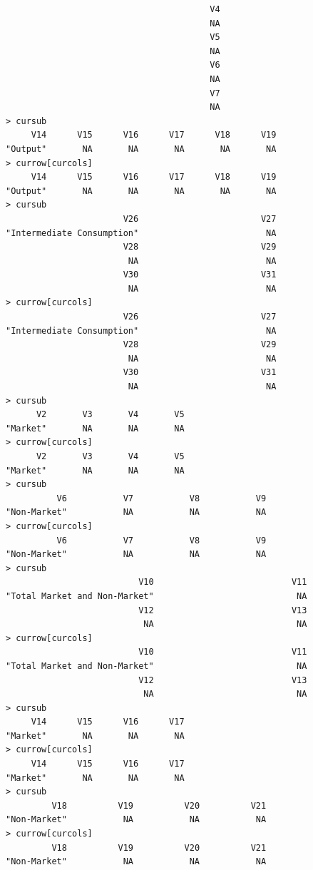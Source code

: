 \documentclass[a4paper]{article}
\begin{document}
\begin{verbatim}
                                        V4 
                                        NA 
                                        V5 
                                        NA 
                                        V6 
                                        NA 
                                        V7 
                                        NA 
> cursub 
     V14      V15      V16      V17      V18      V19 
"Output"       NA       NA       NA       NA       NA 
> currow[curcols] 
     V14      V15      V16      V17      V18      V19 
"Output"       NA       NA       NA       NA       NA 
> cursub 
                       V26                        V27 
"Intermediate Consumption"                         NA 
                       V28                        V29 
                        NA                         NA 
                       V30                        V31 
                        NA                         NA 
> currow[curcols] 
                       V26                        V27 
"Intermediate Consumption"                         NA 
                       V28                        V29 
                        NA                         NA 
                       V30                        V31 
                        NA                         NA 
> cursub 
      V2       V3       V4       V5 
"Market"       NA       NA       NA 
> currow[curcols] 
      V2       V3       V4       V5 
"Market"       NA       NA       NA 
> cursub 
          V6           V7           V8           V9 
"Non-Market"           NA           NA           NA 
> currow[curcols] 
          V6           V7           V8           V9 
"Non-Market"           NA           NA           NA 
> cursub 
                          V10                           V11 
"Total Market and Non-Market"                            NA 
                          V12                           V13 
                           NA                            NA 
> currow[curcols] 
                          V10                           V11 
"Total Market and Non-Market"                            NA 
                          V12                           V13 
                           NA                            NA 
> cursub 
     V14      V15      V16      V17 
"Market"       NA       NA       NA 
> currow[curcols] 
     V14      V15      V16      V17 
"Market"       NA       NA       NA 
> cursub 
         V18          V19          V20          V21 
"Non-Market"           NA           NA           NA 
> currow[curcols] 
         V18          V19          V20          V21 
"Non-Market"           NA           NA           NA 

\end{verbatim}
\end{document}

